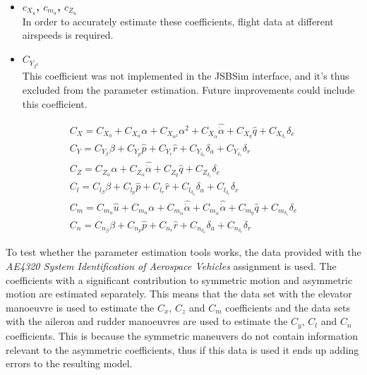 \begin{itemize}
    \item \textbf{$c_{X_u}$, $c_{m_u}$, $c_{Z_u}$}\\
    In order to accurately estimate these coefficients, flight data at different airspeeds is required.

    \item \textbf{$C_{Y_{\beta^2}}$}\\
    This coefficient was not implemented in the JSBSim interface, and it's thus excluded from the parameter estimation. Future improvements could include this coefficient.
    
\end{itemize}

\begin{equation}
    \begin{array}{*{20}{l}}
        {{C_X} = {C_{{X_0}}} + {C_{{X_\alpha }}}\alpha  + {C_{{X_{{\alpha ^2}}}}}{\alpha ^2} + C_{{X_{\dot{\alpha}}}}\hat{\dot{\alpha}} + {C_{{X_q}}}\hat q + {C_{{X_{{\delta _e}}}}}{\delta _e}}\\
        
        {{C_Y} = {C_{{Y_\beta }}}\beta  + {C_{{Y_p}}}\hat p + {C_{{Y_r}}}\hat r + {C_{{Y_{{\delta _a}}}}}{\delta _a} + {C_{{Y_{{\delta _r}}}}}{\delta _r}}\\
        {{C_Z} = {C_{{Z_\alpha }}}\alpha + C_{{Z_{\dot{\alpha}}}}\hat{\dot{\alpha}} + {C_{{Z_q}}}\hat q + {C_{{Z_{{\delta _e}}}}}{\delta _e}}\\
        {{C_l} = {C_{{l_\beta }}}\beta  + {C_{{l_p}}}\hat p + {C_{{l_r}}}\hat r + {C_{{l_{{\delta _a}}}}}{\delta _a} + {C_{{l_{{\delta _r}}}}}{\delta _r}}\\
        {{C_m} = {C_{{m_u}}}\hat u + {C_{{m_\alpha }}}\alpha + C_{{m_{\dot{\alpha}}}}\hat{\dot{\alpha}} + {C_{{m_{\dot \alpha }}}}\hat \dot \alpha  + {C_{{m_q}}}\hat q + {C_{{m_{{\delta _e}}}}}{\delta _e}}\\
        {{C_n} = {C_{{n_\beta }}}\beta  + {C_{{n_p}}}\hat p + {C_{{n_r}}}\hat r + {C_{{n_{{\delta _a}}}}}{\delta _a} + {C_{{n_{{\delta _r}}}}}{\delta _r}}
    \end{array}
    \label{eq:pe_mod_struct}
\end{equation}

To test whether the parameter estimation tools works, the data provided with the \textit{AE4320 System Identification of Aerospace Vehicles} assignment is used. The coefficients with a significant contribution to symmetric motion and asymmetric motion are estimated separately. This means that the data set with the elevator manoeuvre is used to estimate the $C_x$, $C_z$ and $C_m$ coefficients and the data sets with the aileron and rudder manoeuvres are used to estimate the $C_y$, $C_l$ and $C_n$ coefficients. This is because the symmetric maneuvers do not contain information relevant to the asymmetric coefficients, thus if this data is used it ends up adding errors to the resulting model.\\

